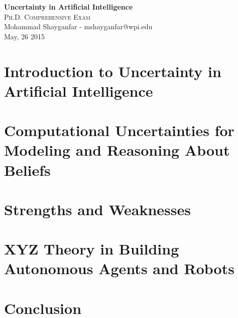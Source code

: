 \documentclass[11pt]{article}
\begin{document}

\begin{center}
{\LARGE{\textbf{Uncertainty in Artificial Intelligence}}} \\
\Large\textsc{Ph.D. Comprehensive Exam} \\[1em]
\large\textnormal{Mohammad Shayganfar - mshayganfar@wpi.edu} \\
\large\textnormal{May, 26 2015}
\end{center}

\section{Introduction to Uncertainty in Artificial Intelligence}

\section{Computational Uncertainties for Modeling and Reasoning About Beliefs}

\section{Strengths and Weaknesses}

\section{XYZ Theory in Building Autonomous Agents and Robots}

\section{Conclusion}



\end{document}
